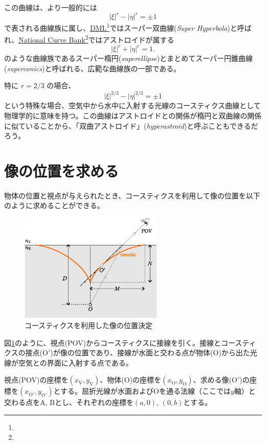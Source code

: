 \documentclass[twocolumn]{article}
\begin{document}
この曲線は、より一般的には
$$ \left| \xi \right|^{r} - \left| \eta \right|^{r} = \pm1 $$
で表される曲線族に属し、\href{http://dynamicmathematicslearning.com/super-ellipse.html}{DML}\footnote{}ではスーパー双曲線(\emph{Super Hyperbola})と呼ばれ、\href{https://old.nationalcurvebank.org/superconicncb/superconicncb.htm}{National Curve Bank}\footnote{}ではアストロイドが属する
$$ \left| \xi \right|^{r} + \left| \eta \right|^{r} = 1. $$
のような曲線族であるスーパー楕円(\emph{superellipse})とまとめてスーパー円錐曲線(\emph{superconics})と呼ばれる、広範な曲線族の一部である。

特に $r = 2/3$ の場合、
$$ \left| \xi \right|^{2/3} - \left| \eta \right|^{2/3} = \pm1 $$
という特殊な場合、空気中から水中に入射する光線のコースティクス曲線として物理学的に意味を持つ。この曲線はアストロイドとの関係が楕円と双曲線の関係に似ていることから、「双曲アストロイド」(\emph{hyperastroid})と呼ぶこともできるだろう。
	
\section{像の位置を求める}

物体の位置と視点が与えられたとき、コースティクスを利用して像の位置を以下のように求めることができる。

\begin{figure}[!h]
	\centering
	\includegraphics[width=2.7in]{figs/g394.eps}
	\caption{コースティクスを利用した像の位置決定}
	\label{fig:image_caustic}
\end{figure}

図\ref{fig:image_caustic}のように、視点(POV)からコースティクスに接線を引く。接線とコースティクスの接点($\mathrm{O'}$)が像の位置であり、接線が水面と交わる点が物体($\mathrm{O}$)から出た光線が空気との界面に入射する点である。

視点(POV)の座標を$(x_{\mathrm{V}}^{}, y_{\mathrm{V}}^{})$、物体($\mathrm{O}$)の座標を$(x_{\mathrm{O}}^{}, y_{\mathrm{O}}^{})$、求める像($\mathrm{O'}$)の座標を$(x_{\mathrm{O'}}^{}, y_{\mathrm{O'}}^{})$とする。屈折光線が水面および$\mathrm{O}$を通る法線（ここでは$y$軸）と交わる点をA, Bとし、それぞれの座標を$(a, 0)$, $(0, b)$とする。
\end{document}
